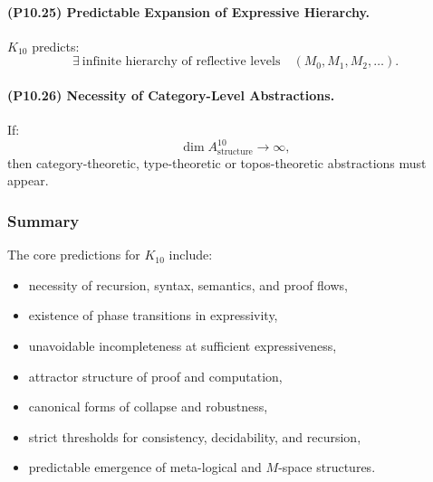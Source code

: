 \paragraph{(P10.25) Predictable Expansion of Expressive Hierarchy.}
$K_{10}$ predicts:
\[
\exists \ \text{infinite hierarchy of reflective levels}
\quad (M_0, M_1, M_2, \ldots).
\]

\paragraph{(P10.26) Necessity of Category-Level Abstractions.}
If:
\[
\dim A_{\mathrm{structure}}^{10} \to \infty,
\]
then category-theoretic, type-theoretic or topos-theoretic
abstractions must appear.

\subsubsection{Summary}

The core predictions for $K_{10}$ include:
\begin{itemize}
    \item necessity of recursion, syntax, semantics, and proof flows,
    \item existence of phase transitions in expressivity,
    \item unavoidable incompleteness at sufficient expressiveness,
    \item attractor structure of proof and computation,
    \item canonical forms of collapse and robustness,
    \item strict thresholds for consistency, decidability, and recursion,
    \item predictable emergence of meta-logical and $M$-space structures.
\end{itemize}
